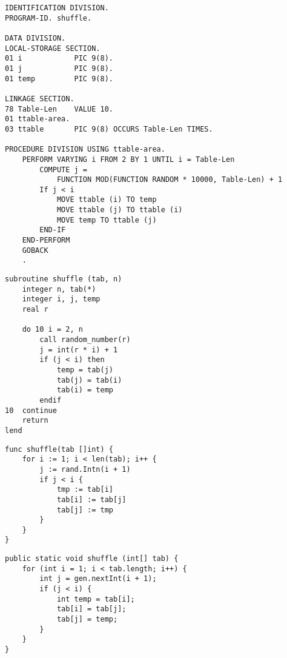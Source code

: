 \documentclass[a4paper,12pt]{book}
\begin{document}
\begin{encadre}
\begin{verbatim}
IDENTIFICATION DIVISION.
PROGRAM-ID. shuffle.

DATA DIVISION.
LOCAL-STORAGE SECTION.
01 i            PIC 9(8).
01 j            PIC 9(8).
01 temp         PIC 9(8).

LINKAGE SECTION.
78 Table-Len    VALUE 10.
01 ttable-area.
03 ttable       PIC 9(8) OCCURS Table-Len TIMES.

PROCEDURE DIVISION USING ttable-area.
    PERFORM VARYING i FROM 2 BY 1 UNTIL i = Table-Len
        COMPUTE j =
            FUNCTION MOD(FUNCTION RANDOM * 10000, Table-Len) + 1
        If j < i
            MOVE ttable (i) TO temp
            MOVE ttable (j) TO ttable (i)
            MOVE temp TO ttable (j)
        END-IF
    END-PERFORM
    GOBACK
    .
\end{verbatim}
\end{encadre}

\begin{encadre}
\begin{verbatim}
subroutine shuffle (tab, n)
    integer n, tab(*)
    integer i, j, temp
    real r

    do 10 i = 2, n
        call random_number(r)
        j = int(r * i) + 1
        if (j < i) then
            temp = tab(j)
            tab(j) = tab(i)
            tab(i) = temp
        endif
10  continue
    return
lend
\end{verbatim}
\end{encadre}

\begin{encadre}[code Go]
\begin{verbatim}
func shuffle(tab []int) {
    for i := 1; i < len(tab); i++ {
        j := rand.Intn(i + 1)
        if j < i {
            tmp := tab[i]
            tab[i] := tab[j]
            tab[j] := tmp
        } 
    }
}
\end{verbatim}
\end{encadre}

\begin{encadre}
\begin{verbatim}
public static void shuffle (int[] tab) {
    for (int i = 1; i < tab.length; i++) {
        int j = gen.nextInt(i + 1);
        if (j < i) {
            int temp = tab[i];
            tab[i] = tab[j];
            tab[j] = temp;
        }
    }
}
\end{verbatim}
\end{encadre}
\end{document}
